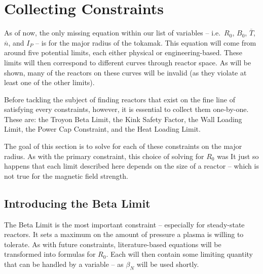 \section{Collecting  Constraints}

As of now, the only missing equation within our list of  variables -- i.e.\ $R_0$, $B_0$, $\overline T$, $\overline n$, and $I_P$ -- is for the major radius of the tokamak. This equation will come from around five potential limits, each either physical or engineering-based. These limits will then correspond to different curves through reactor space. As will be shown, many of the reactors on these curves will be invalid (as they violate at least one of the other limits). 

Before tackling the subject of finding reactors that exist on the fine line of satisfying every  constraints, however, it is essential to collect them one-by-one. These are: the Troyon Beta Limit, the Kink Safety Factor, the Wall Loading Limit, the Power Cap Constraint, and the Heat Loading Limit.

The goal of this section is to solve for each of these constraints on the major radius. As with the primary constraint, this choice of solving for $R_0$ was  It just so happens that each limit described here depends on the size of a reactor -- which is not true for the magnetic field strength.

\subsection{Introducing the Beta Limit}

The Beta Limit is the most important  constraint -- especially for steady-state reactors. It sets a maximum on the amount of pressure a plasma is willing to tolerate. As with future  constraints, literature-based equations will be transformed into formulas for $R_0$. Each will then contain some limiting quantity that can be handled by a  variable -- as $\beta_N$ will be used shortly.

